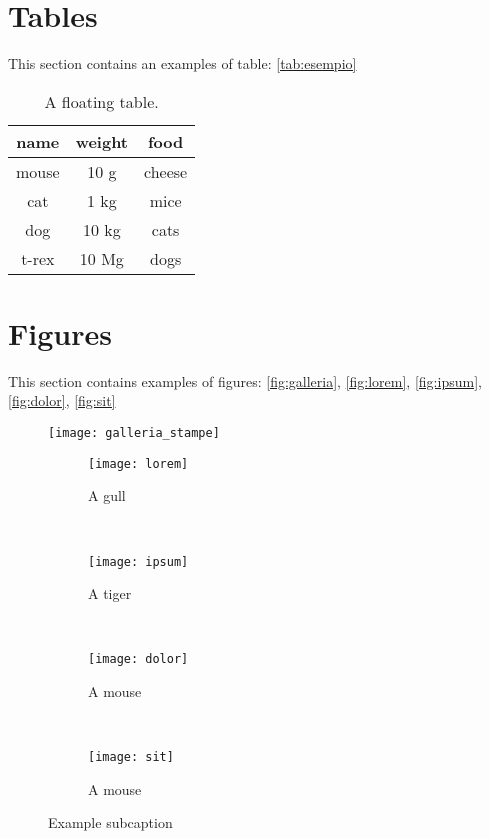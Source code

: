 \section{Tables}

This section contains an examples of table: \autoref{tab:esempio}

\begin{table}[H]
	\centering
	\begin{tabular}{ccc}
		\toprule
		name & weight & food \\
		\midrule
		mouse	& 10 g	& cheese \\
		cat	& 1 kg	& mice \\
		dog	& 10 kg	& cats \\
		t-rex	& 10 Mg	& dogs \\
		\bottomrule
	\end{tabular}
	\caption[A floating table]{A floating table.}
	\label{tab:esempio}
\end{table}

\section{Figures}

This section contains examples of figures: \autoref{fig:galleria}, \autoref{fig:lorem}, \autoref{fig:ipsum}, \autoref{fig:dolor}, \autoref{fig:sit}

\begin{figure}[H]
	\centering
	\texttt{[image: galleria\_stampe]}
	\label{fig:galleria}
\end{figure}

\begin{figure}[H]
	\centering
	\begin{subfigure}[b]{0.45\textwidth}
		\texttt{[image: lorem]}
		\caption{A gull}
		\label{fig:lorem}
	\end{subfigure}
	~ %
	\begin{subfigure}[b]{0.45\textwidth}
		\texttt{[image: ipsum]}
		\caption{A tiger}
		\label{fig:ipsum}
	\end{subfigure}
	~ %
	\begin{subfigure}[b]{0.45\textwidth}
		\texttt{[image: dolor]}
		\caption{A mouse}
		\label{fig:dolor}
	\end{subfigure}
	~ %
	\begin{subfigure}[b]{0.45\textwidth}
		\texttt{[image: sit]}
		\caption{A mouse}
		\label{fig:sit}
	\end{subfigure}
	\caption{Example subcaption}\label{fig:animals}
\end{figure}


